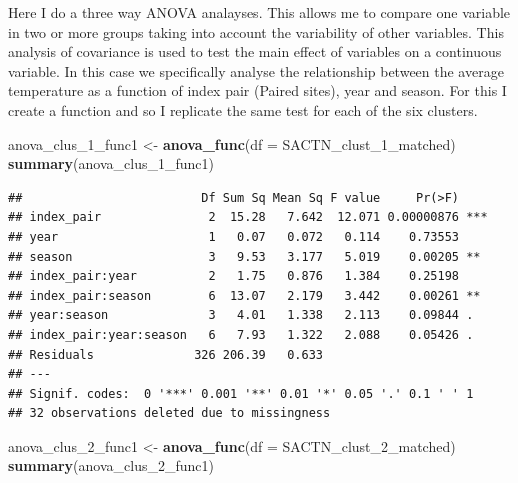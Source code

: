 \documentclass[10pt,A4,]{article}
\newenvironment{Shaded}{\begin{snugshade}}{\end{snugshade}}
\newcommand{\KeywordTok}[1]{\textcolor[rgb]{0.13,0.29,0.53}{\textbf{#1}}}
\newcommand{\DataTypeTok}[1]{\textcolor[rgb]{0.13,0.29,0.53}{#1}}
\newcommand{\StringTok}[1]{\textcolor[rgb]{0.31,0.60,0.02}{#1}}
\newcommand{\NormalTok}[1]{#1}
\begin{document}
Here I do a three way ANOVA analayses. This allows me to compare one
variable in two or more groups taking into account the variability of
other variables. This analysis of covariance is used to test the main
effect of variables on a continuous variable. In this case we
specifically analyse the relationship between the average temperature as
a function of index pair (Paired sites), year and season. For this I
create a function and so I replicate the same test for each of the six
clusters.

\begin{Shaded}
\begin{Highlighting}[]
\NormalTok{anova_clus_1_func1 <-}\StringTok{ }\KeywordTok{anova_func}\NormalTok{(}\DataTypeTok{df =}\NormalTok{ SACTN_clust_1_matched)}
\KeywordTok{summary}\NormalTok{(anova_clus_1_func1)}
\end{Highlighting}
\end{Shaded}

\begin{verbatim}
##                         Df Sum Sq Mean Sq F value     Pr(>F)    
## index_pair               2  15.28   7.642  12.071 0.00000876 ***
## year                     1   0.07   0.072   0.114    0.73553    
## season                   3   9.53   3.177   5.019    0.00205 ** 
## index_pair:year          2   1.75   0.876   1.384    0.25198    
## index_pair:season        6  13.07   2.179   3.442    0.00261 ** 
## year:season              3   4.01   1.338   2.113    0.09844 .  
## index_pair:year:season   6   7.93   1.322   2.088    0.05426 .  
## Residuals              326 206.39   0.633                       
## ---
## Signif. codes:  0 '***' 0.001 '**' 0.01 '*' 0.05 '.' 0.1 ' ' 1
## 32 observations deleted due to missingness
\end{verbatim}

\begin{Shaded}
\begin{Highlighting}[]
\NormalTok{anova_clus_2_func1 <-}\StringTok{ }\KeywordTok{anova_func}\NormalTok{(}\DataTypeTok{df =}\NormalTok{ SACTN_clust_2_matched)}
\KeywordTok{summary}\NormalTok{(anova_clus_2_func1)}
\end{Highlighting}
\end{Shaded}
\end{document}
